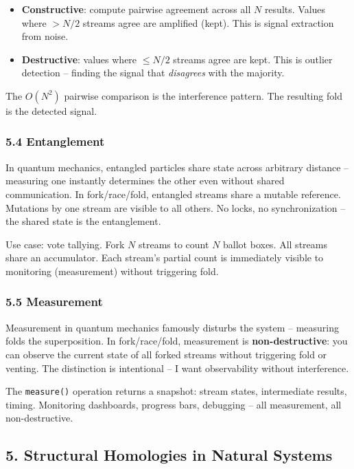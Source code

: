 \documentclass[
  11pt,
]{article}
\begin{document}
\begin{itemize}
\item
  \textbf{Constructive}: compute pairwise agreement across all \(N\)
  results. Values where \(> N/2\) streams agree are amplified (kept).
  This is signal extraction from noise.
\item
  \textbf{Destructive}: values where \(\leq N/2\) streams agree are
  kept. This is outlier detection -- finding the signal that
  \emph{disagrees} with the majority.
\end{itemize}

The \(O(N^2)\) pairwise comparison is the interference pattern. The
resulting fold is the detected signal.

\subsubsection{5.4 Entanglement}\label{entanglement}

In quantum mechanics, entangled particles share state across arbitrary
distance -- measuring one instantly determines the other even without
shared communication. In fork/race/fold, entangled streams share a
mutable reference. Mutations by one stream are visible to all others. No
locks, no synchronization -- the shared state is the entanglement.

Use case: vote tallying. Fork \(N\) streams to count \(N\) ballot boxes.
All streams share an accumulator. Each stream's partial count is
immediately visible to monitoring (measurement) without triggering fold.

\subsubsection{5.5 Measurement}\label{measurement}

Measurement in quantum mechanics famously disturbs the system --
measuring folds the superposition. In fork/race/fold, measurement is
\textbf{non-destructive}: you can observe the current state of all
forked streams without triggering fold or venting. The distinction is
intentional -- I want observability without interference.

The \texttt{measure()} operation returns a snapshot: stream states,
intermediate results, timing. Monitoring dashboards, progress bars,
debugging -- all measurement, all non-destructive.

\subsection{5. Structural Homologies in Natural
Systems}\label{structural-homologies-in-natural-systems}
\end{document}
